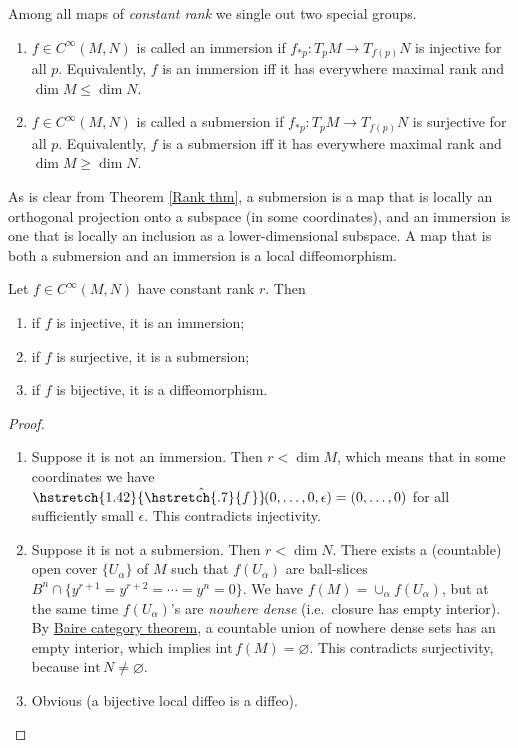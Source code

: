 \documentclass[english,letterpaper]{article}%
\numberwithin{equation}{section}
\numberwithin{figure}{section}
\numberwithin{table}{section}
\theoremstyle{definition}
\theoremstyle{definition}
\theoremstyle{definition}
\theoremstyle{plain}
\theoremstyle{plain}
\theoremstyle{plain}
\theoremstyle{plain}
\theoremstyle{remark}
\theoremstyle{remark}
\renewcommand{\geq}{\geqslant}
\renewcommand{\leq}{\leqslant}
\newcommand\wh[1]{\hstretch{1.42}{\hat{\hstretch{.7}{#1\mkern2mu}}}\mkern-2mu} %
\begin{document}
\begin{defn}Among all maps of \emph{constant rank} we single out two special groups.
\begin{enumerate}
    \item $f\in C^\infty(M,N)$ is called an immersion if $f_{\ast p}:T_p M\to T_{f(p)} N$ is injective for all $p$. Equivalently, $f$ is an immersion iff it has everywhere maximal rank and $\dim M\leq \dim N$.
    \item $f\in C^\infty(M,N)$ is called a submersion if $f_{\ast p}:T_p M\to T_{f(p)} N$ is surjective for all $p$. Equivalently, $f$ is a submersion iff it has everywhere maximal rank and $\dim M\geq \dim N$.
\end{enumerate}
\end{defn}

\begin{rem}
As is clear from Theorem \ref{Rank thm}, a submersion is a map that is locally an orthogonal projection onto a subspace (in some coordinates), and an immersion is one that is locally an inclusion as a lower-dimensional subspace. A map that is both a submersion and an immersion is a local diffeomorphism.
\end{rem}

\begin{thm}\label{Global rank}
Let $f\in C^\infty(M,N)$ have constant rank $r$. Then
\begin{enumerate}
    \item if $f$ is injective, it is an immersion;
    \item if $f$ is surjective, it is a submersion;
    \item if $f$ is bijective, it is a diffeomorphism.
\end{enumerate}
\end{thm}
\begin{proof}
\begin{enumerate}
    \item Suppose it is not an immersion. Then $r<\dim M$, which means that in some coordinates we have $\wh{f}(0,\ldots,0,\epsilon)=(0,\ldots,0)$ for all sufficiently small $\epsilon$. This contradicts injectivity.
    \item Suppose it is not a submersion. Then $r<\dim N$. There exists a (countable) open cover  $\{U_\alpha\}$ of $M$ such that $f(U_\alpha)$ are ball-slices $B^n\cap \{y^{r+1}=y^{r+2}=\cdots=y^n=0\}$. We have $f(M)=\cup_\alpha f(U_\alpha)$, but at the same time $f(U_\alpha)$'s are \emph{nowhere dense} (i.e.\ closure has empty interior). By \href{https://en.wikipedia.org/wiki/Baire_category_theorem}{Baire category theorem}, a countable union of nowhere dense sets has an empty interior, which implies $\text{int}\,f(M)=\varnothing$. This contradicts surjectivity, because $\text{int}\,N\neq\varnothing$.
    \item Obvious (a bijective local diffeo is a diffeo).
\end{enumerate}
\end{proof}
\end{document}
